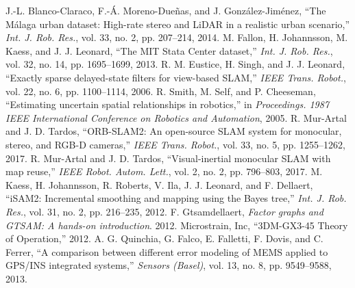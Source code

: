 \documentclass[letterpaper, 10 pt, conference]{ieeeconf}  %
\begin{document}
\begin{thebibliography}{99}
 J.-L. Blanco-Claraco, F.-Á. Moreno-Dueñas, and J. González-Jiménez, “The Málaga urban dataset: High-rate stereo and LiDAR in a realistic urban scenario,” \textit{Int. J. Rob. Res.}, vol. 33, no. 2, pp. 207–214, 2014.
 M. Fallon, H. Johannsson, M. Kaess, and J. J. Leonard, “The MIT Stata Center dataset,” \textit{Int. J. Rob. Res.}, vol. 32, no. 14, pp. 1695–1699, 2013.
 R. M. Eustice, H. Singh, and J. J. Leonard, “Exactly sparse delayed-state filters for view-based SLAM,” \textit{IEEE Trans. Robot.}, vol. 22, no. 6, pp. 1100–1114, 2006.
 R. Smith, M. Self, and P. Cheeseman, “Estimating uncertain spatial relationships in robotics,” in \textit{Proceedings. 1987 IEEE International Conference on Robotics and Automation}, 2005.
 R. Mur-Artal and J. D. Tardos, “ORB-SLAM2: An open-source SLAM system for monocular, stereo, and RGB-D cameras,” \textit{IEEE Trans. Robot.}, vol. 33, no. 5, pp. 1255–1262, 2017.
 R. Mur-Artal and J. D. Tardos, “Visual-inertial monocular SLAM with map reuse,” \textit{IEEE Robot. Autom. Lett.}, vol. 2, no. 2, pp. 796–803, 2017.
 M. Kaess, H. Johannsson, R. Roberts, V. Ila, J. J. Leonard, and F. Dellaert, “iSAM2: Incremental smoothing and mapping using the Bayes tree,” \textit{Int. J. Rob. Res.}, vol. 31, no. 2, pp. 216–235, 2012.
 F. Gtsamdellaert, \textit{Factor graphs and GTSAM: A hands-on introduction}. 2012.
 Microstrain, Inc, “3DM-GX3-45 Theory of Operation,” 2012.
	A. G. Quinchia, G. Falco, E. Falletti, F. Dovis, and C. Ferrer, “A comparison between different error modeling of MEMS applied to GPS/INS integrated systems,” \textit{Sensors (Basel)}, vol. 13, no. 8, pp. 9549–9588, 2013.







\end{thebibliography}
\end{document}
